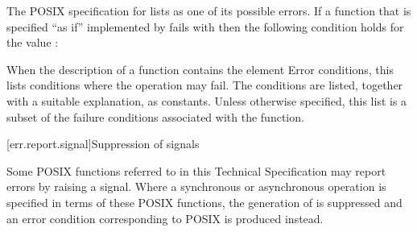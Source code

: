 \pnum
\begin{example} The POSIX specification for  lists  as one of its possible errors. If a function that is specified ``as if'' implemented by  fails with  then the following condition holds for the  value :  \end{example}

\pnum
When the description of a function contains the element Error conditions, this lists conditions where the operation may fail. The conditions are listed, together with a suitable explanation, as  constants. Unless otherwise specified, this list is a subset of the failure conditions associated with the function.



[err.report.signal]{Suppression of signals}

\pnum
Some POSIX functions referred to in this Technical Specification may report errors by raising a  signal. Where a synchronous or asynchronous operation is specified in terms of these POSIX functions, the generation of  is suppressed and an error condition corresponding to POSIX  is produced instead.



